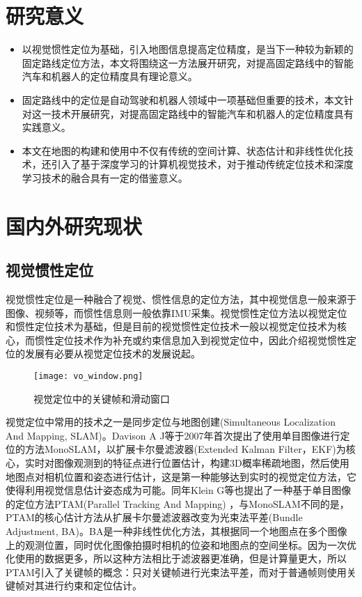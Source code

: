 \section{研究意义}
\begin{itemize}
  \item 以视觉惯性定位为基础，引入地图信息提高定位精度，是当下一种较为新颖的固定路线定位方法，本文将围绕这一方法展开研究，对提高固定路线中的智能汽车和机器人的定位精度具有理论意义。
  \item 固定路线中的定位是自动驾驶和机器人领域中一项基础但重要的技术，本文针对这一技术开展研究，对提高固定路线中的智能汽车和机器人的定位精度具有实践意义。
  \item 本文在地图的构建和使用中不仅有传统的空间计算、状态估计和非线性优化技术，还引入了基于深度学习的计算机视觉技术，对于推动传统定位技术和深度学习技术的融合具有一定的借鉴意义。
\end{itemize}


\section{国内外研究现状}
\subsection{视觉惯性定位}

视觉惯性定位是一种融合了视觉、惯性信息的定位方法，其中视觉信息一般来源于图像、视频等，而惯性信息则一般依靠IMU采集。视觉惯性定位方法以视觉定位和惯性定位技术为基础，但是目前的视觉惯性定位技术一般以视觉定位技术为核心，而惯性定位技术作为补充或约束信息加入到视觉定位中，因此介绍视觉惯性定位的发展有必要从视觉定位技术的发展说起。


\begin{figure}
  \centering
  \texttt{[image: vo\_window.png]}
  \caption{视觉定位中的关键帧和滑动窗口}
  \label{fig:vo_window}
\end{figure}

视觉定位中常用的技术之一是同步定位与地图创建(Simultaneous Localization And Mapping, SLAM)。Davison A J等\cite{davison2007monoslam}于2007年首次提出了使用单目图像进行定位的方法MonoSLAM，以扩展卡尔曼滤波器(Extended Kalman Filter，EKF)为核心，实时对图像观测到的特征点进行位置估计，构建3D概率稀疏地图，然后使用地图点对相机位置和姿态进行估计，这是第一种能够达到实时的视觉定位方法，它使得利用视觉信息估计姿态成为可能。同年Klein G等\cite{klein2007parallel}也提出了一种基于单目图像的定位方法PTAM(Parallel Tracking And Mapping) ，与MonoSLAM不同的是，PTAM的核心估计方法从扩展卡尔曼滤波器改变为光束法平差(Bundle Adjustment, BA)\cite{triggs2000bundle}。BA是一种非线性优化方法，其根据同一个地图点在多个图像上的观测位置，同时优化图像拍摄时相机的位姿和地图点的空间坐标。因为一次优化使用的数据更多，所以这种方法相比于滤波器更准确，但是计算量更大，所以PTAM引入了关键帧的概念：只对关键帧进行光束法平差，而对于普通帧则使用关键帧对其进行约束和定位估计。

